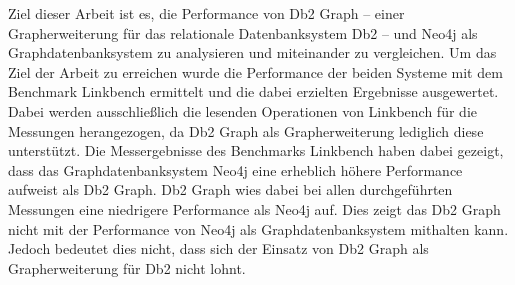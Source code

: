 Ziel dieser Arbeit ist es, die Performance von Db2 Graph -- einer Grapherweiterung für das relationale Datenbanksystem Db2 -- und Neo4j als Graphdatenbanksystem zu analysieren und miteinander zu vergleichen. Um das Ziel der Arbeit zu erreichen wurde die Performance der beiden Systeme mit dem Benchmark Linkbench ermittelt und die dabei erzielten Ergebnisse ausgewertet. Dabei werden ausschließlich die lesenden Operationen von Linkbench für die Messungen herangezogen, da Db2 Graph als Grapherweiterung lediglich diese unterstützt. Die Messergebnisse des Benchmarks Linkbench haben dabei gezeigt, dass das Graphdatenbanksystem Neo4j eine erheblich höhere Performance aufweist als Db2 Graph. Db2 Graph wies dabei bei allen durchgeführten Messungen eine niedrigere Performance als Neo4j auf. Dies zeigt das Db2 Graph nicht mit der Performance von Neo4j als Graphdatenbanksystem mithalten kann. Jedoch bedeutet dies nicht, dass sich der Einsatz von Db2 Graph als Grapherweiterung für Db2 nicht lohnt.